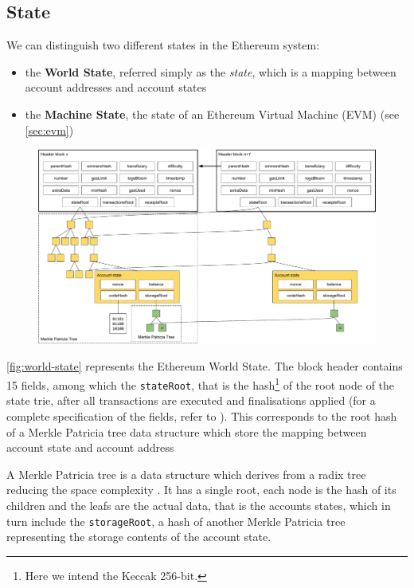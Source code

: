 \subsection{State}

We can distinguish two different states in the Ethereum system:

\begin{itemize}
  \item the \textbf{World State}, referred simply as the \emph{state}, which is
  a mapping between account addresses and account states
  \item the \textbf{Machine State}, the state of an Ethereum Virtual Machine
  (EVM) (see \autoref{sec:evm})
\end{itemize}

\begin{figure}[h]
  \centering
  \includegraphics[width=\textwidth]{./res/img/world-state.pdf}
\label{fig:world-state}
\end{figure}

\autoref{fig:world-state} represents the Ethereum World State. The block header
contains 15 fields, among which the \verb+stateRoot+, that is the
hash\footnote{Here we intend the Keccak 256-bit.} of the root node of the state
trie, after all transactions are executed and finalisations applied (for a
complete specification of the fields, refer to \cite{wood2018ethereum}). This
corresponds to the root hash of a Merkle Patricia tree data structure which
store the mapping between account state and account address

A Merkle Patricia tree is a data structure which derives from a radix tree
reducing the space complexity \cite{patriciatree}. It has a single root, each
node is the hash of its children and the leafs are the actual data, that is the
accounts states, which in turn include the \verb+storageRoot+, a hash of another
Merkle Patricia tree representing the storage contents of the account state.

